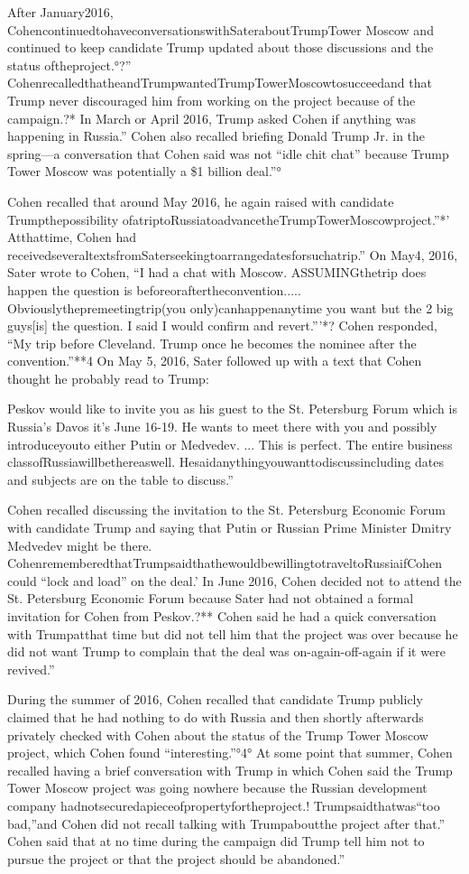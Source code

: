 After January2016, CohencontinuedtohaveconversationswithSateraboutTrumpTower Moscow and continued to keep candidate Trump updated about those discussions and the status oftheproject.°?”
CohenrecalledthatheandTrumpwantedTrumpTowerMoscowtosucceedand that Trump never discouraged him from working on the project because of the campaign.?*
In March or April 2016, Trump asked Cohen if anything was happening in Russia.”
Cohen also recalled briefing Donald Trump Jr. in the spring—a conversation that Cohen said was not “idle chit chat” because Trump Tower Moscow was potentially a \$1 billion deal.”°

Cohen recalled that around May 2016, he again raised with candidate Trumpthepossibility ofatriptoRussiatoadvancetheTrumpTowerMoscowproject.”*'
Atthattime, Cohen had receivedseveraltextsfromSaterseekingtoarrangedatesforsuchatrip.”
On May4, 2016, Sater wrote to Cohen, “I had a chat with Moscow.
ASSUMINGthetrip does happen the question is beforeoraftertheconvention.....
Obviouslythepremeetingtrip(you only)canhappenanytime you want but the 2 big guys[is] the question.
I said I would confirm and revert.”'*?
Cohen responded, “My trip before Cleveland.
Trump once he becomes the nominee after the convention.”**4
On May 5, 2016, Sater followed up with a text that Cohen thought he probably read to Trump:

Peskov would like to invite you as his guest to the St. Petersburg Forum which is Russia's Davos it's June 16-19.
He wants to meet there with you and possibly introduceyouto either Putin or Medvedev. ...
This is perfect.
The entire business classofRussiawillbethereaswell.
Hesaidanythingyouwanttodiscussincluding dates and subjects are on the table to discuss.”

Cohen recalled discussing the invitation to the St. Petersburg Economic Forum with candidate Trump and saying that Putin or Russian Prime Minister Dmitry Medvedev might be there.
CohenrememberedthatTrumpsaidthathewouldbewillingtotraveltoRussiaifCohen could “lock and load” on the deal.'
In June 2016, Cohen decided not to attend the St. Petersburg Economic Forum because Sater had not obtained a formal invitation for Cohen from Peskov.?**
Cohen said he had a quick conversation with Trumpatthat time but did not tell him that the project was over because he did not want Trump to complain that the deal was on-again-off-again if it were revived.”

During the summer of 2016, Cohen recalled that candidate Trump publicly claimed that he had nothing to do with Russia and then shortly afterwards privately checked with Cohen about the status of the Trump Tower Moscow project, which Cohen found “interesting.”°4°
At some point that summer, Cohen recalled having a brief conversation with Trump in which Cohen said the Trump Tower Moscow project was going nowhere because the Russian development company hadnotsecuredapieceofpropertyfortheproject.!
Trumpsaidthatwas“too bad,”and Cohen did not recall talking with Trumpaboutthe project after that.”
Cohen said that at no time during the campaign did Trump tell him not to pursue the project or that the project should be abandoned.”

